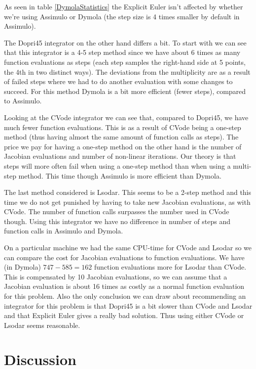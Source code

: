 \documentclass[a4paper,11pt]{article}
\theoremstyle{mytheor}
\begin{document}
As seen in table \ref{DymolaStatistics} the Explicit Euler isn't affected by whether we're using Assimulo or Dymola (the step size is 4 times smaller by default in Assimulo). 

The Dopri45 integrator on the other hand differs a bit. To start with we can see that this integrator is a 4-5 step method since we have about 6 times as many function evaluations as steps (each step samples the right-hand side at 5 points, the 4th in two distinct ways). The deviations from the multiplicity are as a result of failed steps where we had to do another evaluation with some changes to succeed. For this method Dymola is a bit more efficient (fewer steps), compared to Assimulo.

Looking at the CVode integrator we can see that, compared to Dopri45, we have much fewer function evaluations. This is as a result of CVode being a one-step method (thus having almost the same amount of function calls as steps). The price we pay for having a one-step method on the other hand is the number of Jacobian evaluations and number of non-linear iterations. Our theory is that steps will more often fail when using a one-step method than when using a multi-step method. This time though Assimulo is more efficient than Dymola.

The last method considered is Lsodar. This seems to be a 2-step method and this time we do not get punished by having to take new Jacobian evaluations, as with CVode. The number of function calls surpasses the number used in CVode though. Using this integrator we have no difference in number of steps and function calls in Assimulo and Dymola.

On a particular machine we had the same CPU-time for CVode and Lsodar so we can compare the cost for Jacobian evaluations to function evaluations. We have (in Dymola) $747-585=162$ function evaluations more for Lsodar than CVode. This is compensated by 10 Jacobian evaluations, so we can assume that a Jacobian evaluation is about 16 times as costly as a normal function evaluation for this problem. Also the only conclusion we can draw about recommending an integrator for this problem is that Dopri45 is a bit slower than CVode and Lsodar and that Explicit Euler gives a really bad solution. Thus using either CVode or Lsodar seems reasonable.

\section{Discussion}

\end{document}
